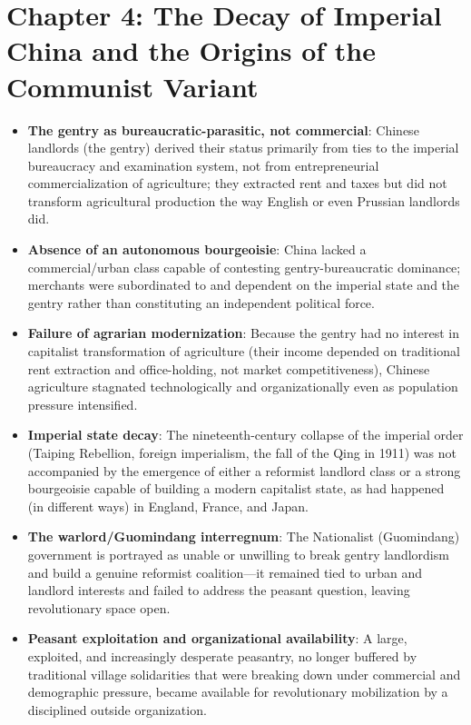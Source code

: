 \documentclass[12pt]{article}
\begin{document}
\section{Chapter 4: The Decay of Imperial China and the Origins of the Communist Variant}

\begin{itemize}[leftmargin=*, itemsep=4pt]
    \item \textbf{The gentry as bureaucratic-parasitic, not commercial}: Chinese landlords (the gentry) derived their status primarily from ties to the imperial bureaucracy and examination system, not from entrepreneurial commercialization of agriculture; they extracted rent and taxes but did not transform agricultural production the way English or even Prussian landlords did.
    \item \textbf{Absence of an autonomous bourgeoisie}: China lacked a commercial/urban class capable of contesting gentry-bureaucratic dominance; merchants were subordinated to and dependent on the imperial state and the gentry rather than constituting an independent political force.
    \item \textbf{Failure of agrarian modernization}: Because the gentry had no interest in capitalist transformation of agriculture (their income depended on traditional rent extraction and office-holding, not market competitiveness), Chinese agriculture stagnated technologically and organizationally even as population pressure intensified.
    \item \textbf{Imperial state decay}: The nineteenth-century collapse of the imperial order (Taiping Rebellion, foreign imperialism, the fall of the Qing in 1911) was not accompanied by the emergence of either a reformist landlord class or a strong bourgeoisie capable of building a modern capitalist state, as had happened (in different ways) in England, France, and Japan.
    \item \textbf{The warlord/Guomindang interregnum}: The Nationalist (Guomindang) government is portrayed as unable or unwilling to break gentry landlordism and build a genuine reformist coalition---it remained tied to urban and landlord interests and failed to address the peasant question, leaving revolutionary space open.
    \item \textbf{Peasant exploitation and organizational availability}: A large, exploited, and increasingly desperate peasantry, no longer buffered by traditional village solidarities that were breaking down under commercial and demographic pressure, became available for revolutionary mobilization by a disciplined outside organization.

\end{itemize}
\end{document}
